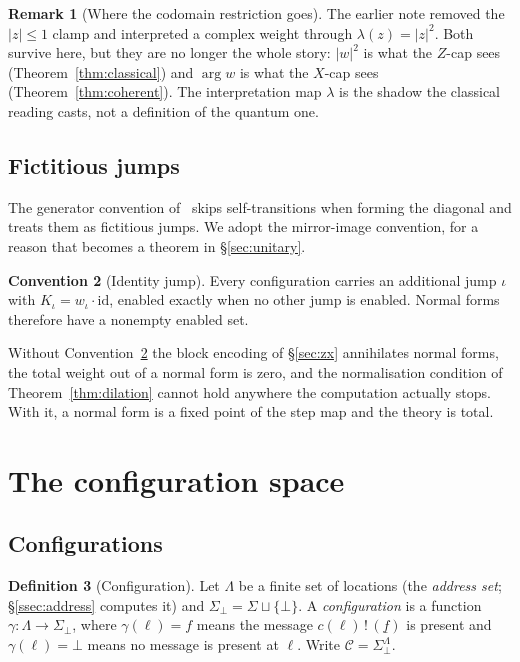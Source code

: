 \documentclass[11pt]{article}
\theoremstyle{definition}
\newtheorem{definition}{Definition}[section]
\newtheorem{remark}[definition]{Remark}
\newtheorem{convention}[definition]{Convention}
\theoremstyle{plain}
\newcommand{\out}[2]{#1\,!\,(#2)}
\newcommand{\Loc}{\Lambda}
\newcommand{\Tags}{\Sigma}
\newcommand{\Tagsb}{\Tags_{\bot}}
\newcommand{\Cfg}{\mathcal{C}}
\newcommand{\id}{\mathrm{id}}
\begin{document}
\begin{remark}[Where the codomain restriction goes]\label{rem:codomain}
The earlier note removed the $|z| \le 1$ clamp and interpreted a complex weight through
$\lambda(z) = |z|^2$. Both survive here, but they are no longer the whole story: $|w|^2$ is
what the $Z$-cap sees (Theorem~\ref{thm:classical}) and $\arg w$ is what the $X$-cap sees
(Theorem~\ref{thm:coherent}). The interpretation map $\lambda$ is the shadow the classical
reading casts, not a definition of the quantum one.
\end{remark}

\subsection{Fictitious jumps}\label{ssec:fictitious}

The generator convention of~\cite{weighted} skips self-transitions when forming the diagonal
and treats them as fictitious jumps. We adopt the mirror-image convention, for a reason that
becomes a theorem in \S\ref{sec:unitary}.

\begin{convention}[Identity jump]\label{conv:idjump}
Every configuration carries an additional jump $\iota$ with $K_\iota = w_\iota \cdot \id$,
enabled exactly when no other jump is enabled. Normal forms therefore have a nonempty enabled
set.
\end{convention}

Without Convention~\ref{conv:idjump} the block encoding of \S\ref{sec:zx} annihilates normal
forms, the total weight out of a normal form is zero, and the normalisation condition of
Theorem~\ref{thm:dilation} cannot hold anywhere the computation actually stops. With it, a
normal form is a fixed point of the step map and the theory is total.

\section{The configuration space}\label{sec:config}

\subsection{Configurations}

\begin{definition}[Configuration]\label{def:cfg}
Let $\Loc$ be a finite set of locations (the \emph{address set}; \S\ref{ssec:address} computes
it) and $\Tagsb = \Tags \sqcup \{\bot\}$. A \emph{configuration} is a function
$\gamma : \Loc \to \Tagsb$, where $\gamma(\ell) = f$ means the message
$\out{c(\ell)}{\underline{f}}$ is present and $\gamma(\ell) = \bot$ means no message is present
at $\ell$. Write $\Cfg = \Tagsb^{\Loc}$.
\end{definition}
\end{document}

